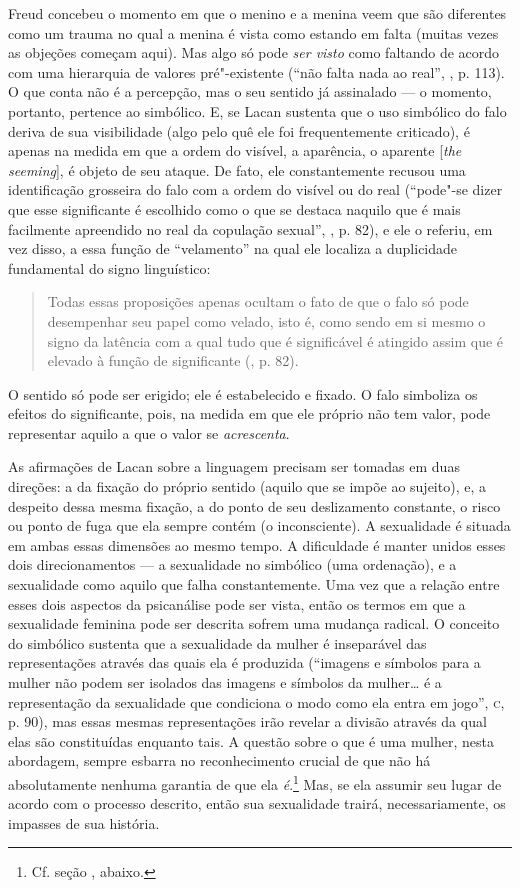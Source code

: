 Freud concebeu o momento em que o menino e a menina veem que são
diferentes como um trauma no qual a menina é vista como estando em falta
(muitas vezes as objeções começam aqui). Mas algo só pode \emph{ser
visto} como faltando de acordo com uma hierarquia de valores
pré"-existente (``não falta nada ao real'', , p. 113). O que conta não
é a percepção, mas o seu sentido já assinalado --- o momento, portanto,
pertence ao simbólico. E, se Lacan sustenta que o uso simbólico do falo
deriva de sua visibilidade (algo pelo quê ele foi frequentemente
criticado), é apenas na medida em que a ordem do visível, a aparência, o
aparente {[}\emph{the seeming}{]}, é objeto de seu ataque. De fato, ele
constantemente recusou uma identificação grosseira do falo com a ordem
do visível ou do real (``pode"-se dizer que esse significante é escolhido
como o que se destaca naquilo que é mais facilmente apreendido no real
da copulação sexual'', , p. 82), e ele o referiu, em vez disso, a essa
função de ``velamento'' na qual ele localiza a duplicidade fundamental
do signo linguístico:

\begin{quote}
Todas essas proposições apenas ocultam o fato de que o falo só pode
desempenhar seu papel como velado, isto é, como sendo em si mesmo o
signo da latência com a qual tudo que é significável é atingido assim
que é elevado à função de significante (, p. 82).
\end{quote}

O sentido só pode ser erigido; ele é estabelecido e fixado. O falo
simboliza os efeitos do significante, pois, na medida em que ele próprio
não tem valor, pode representar aquilo a que o valor se
\emph{acrescenta}.

As afirmações de Lacan sobre a linguagem precisam ser tomadas em duas
direções: a da fixação do próprio sentido (aquilo que se impõe ao
sujeito), e, a despeito dessa mesma fixação, a do ponto de seu
deslizamento constante, o risco ou ponto de fuga que ela sempre contém
(o inconsciente). A sexualidade é situada em ambas essas dimensões ao
mesmo tempo. A dificuldade é manter unidos esses dois direcionamentos ---
a sexualidade no simbólico (uma ordenação), e a sexualidade como aquilo
que falha constantemente. Uma vez que a relação entre esses dois
aspectos da psicanálise pode ser vista, então os termos em que a
sexualidade feminina pode ser descrita sofrem uma mudança radical. O
conceito do simbólico sustenta que a sexualidade da mulher é inseparável
das representações através das quais ela é produzida (``imagens e
símbolos para a mulher não podem ser isolados das imagens e símbolos da
mulher\ldots{} é a representação da sexualidade que condiciona o modo como
ela entra em jogo'', \textsc{c}, p. 90), mas essas mesmas representações irão
revelar a divisão através da qual elas são constituídas enquanto tais. A
questão sobre o que é uma mulher, nesta abordagem, sempre esbarra no
reconhecimento crucial de que não há absolutamente nenhuma garantia de
que ela \emph{é}.\footnote{Cf. seção , abaixo.} Mas, se ela assumir
seu lugar de acordo com o processo descrito, então sua sexualidade
trairá, necessariamente, os impasses de sua história.

